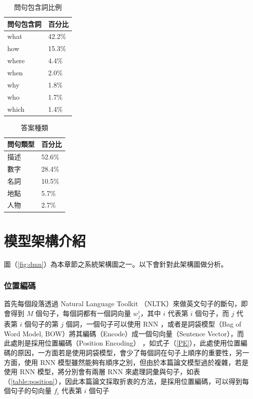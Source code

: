 \begin{table}
    \caption{問句包含詞比例}
    \label{table:query_percentage}
    \centering
    \begin{tabular}[h]{|l|l|}
        \hline
        問句包含詞  &百分比\\
        \hline
        what        &42.2\%\\
        \hline
        how         &15.3\%\\
        \hline
        where       &4.4\%\\
        \hline
        when        &2.0\%\\
        \hline
        why         &1.8\%\\
        \hline
        who         &1.7\%\\
        \hline
        which       &1.4\%\\
        \hline
    \end{tabular}
\end{table}

\begin{table}
    \caption{答案種類}
    \label{table:query_type}
    \centering
    \begin{tabular}{|l|l|}
        \hline
        問句類型            &百分比\\
        \hline
        描述 &52.6\%\\
        \hline
        數字    &28.4\%\\
        \hline
        名詞      &10.5\%\\
        \hline
        地點    &5.7\%\\
        \hline
        人物      &2.7\%\\
        \hline
    \end{tabular}
\end{table}

\section{模型架構介紹}
圖（\ref{fig:dmn}）為本章節之系統架構圖之一。以下會針對此架構圖做分析。

\subsubsection{位置編碼}
首先每個段落透過 Natural Language Toolkit （NLTK）來做英文句子的斷句，即會得到 $M$ 個句子，每個詞都有一個詞向量 $w_j^i$，其中 $i$ 代表第 $i$ 個句子，而 $j$ 代表第 $i$ 個句子的第 $j$ 個詞，一個句子可以使用 RNN ，或者是詞袋模型（Bag of Word Model, BOW）將其編碼（Encode）成一個句向量（Sentence Vector），而此處則是採用位置編碼（Position Encoding）\cite{sukhbaatar2015end}  ，如式子（\ref{PE}），此處使用位置編碼的原因，一方面若是使用詞袋模型，會少了每個詞在句子上順序的重要性，另一方面，使用 RNN 模型雖然能夠有順序之別，但由於本篇論文模型過於複雜，若是使用 RNN 模型，將分別會有兩層 RNN 來處理詞彙與句子，如表（\ref{table:position}），因此本篇論文採取折衷的方法，是採用位置編碼，可以得到每個句子的句向量 $f_i$ 代表第 $i$ 個句子%

